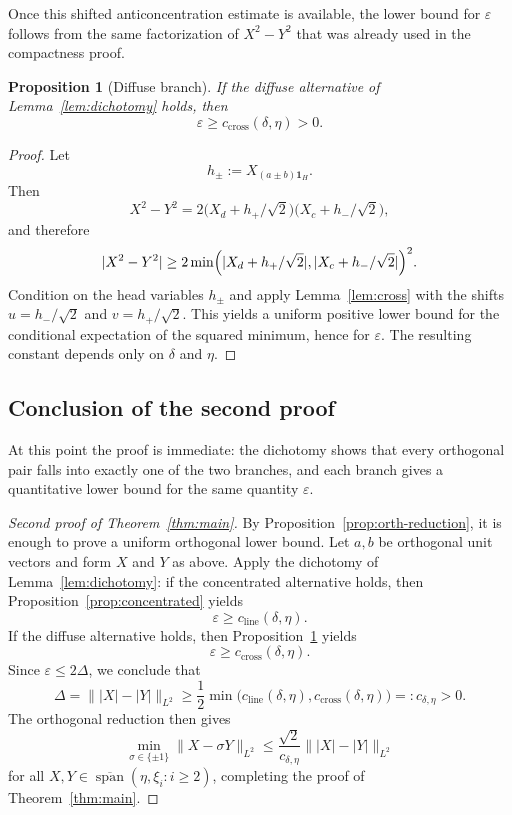 \documentclass[11pt]{amsart}
\numberwithin{equation}{section}
\newtheorem{proposition}[theorem]{Proposition}
\theoremstyle{definition}
\theoremstyle{remark}
\newcommand{\Span}{\operatorname{span}}
\newcommand{\eps}{\varepsilon}
\newcommand{\abs}[1]{\lvert #1 \rvert}
\newcommand{\norm}[1]{\lVert #1 \rVert}
\begin{document}
Once this shifted anticoncentration estimate is available, the lower bound for
$\eps$ follows from the same factorization of $X^2-Y^2$ that was
already used in the compactness proof.

\begin{proposition}[Diffuse branch]\label{prop:diffuse}
If the diffuse alternative of Lemma~\ref{lem:dichotomy} holds, then
\[
\eps\ge c_{\mathrm{cross}}(\delta,\eta)>0.
\]
\end{proposition}

\begin{proof}
Let
\[
h_\pm:=X_{(a\pm b)\mathbf 1_H}.
\]
Then
\[
X^2-Y^2
=2\bigl(X_d+h_+/\sqrt2\bigr)\bigl(X_c+h_-/\sqrt2\bigr),
\]
and therefore
\[
\abs{X^2-Y^2}
\ge
2\min\Bigl(\abs{X_d+h_+/\sqrt2},\abs{X_c+h_-/\sqrt2}\Bigr)^2.
\]
Condition on the head variables $h_\pm$ and apply Lemma~\ref{lem:cross} with
the shifts $u=h_-/\sqrt2$ and $v=h_+/\sqrt2$.  This yields a uniform positive
lower bound for the conditional expectation of the squared minimum, hence for
$\eps$.  The resulting constant depends only on $\delta$ and $\eta$.
\end{proof}

\subsection{Conclusion of the second proof}

At this point the proof is immediate: the dichotomy shows that every
orthogonal pair falls into exactly one of the two branches, and each branch
gives a quantitative lower bound for the same quantity $\eps$.

\begin{proof}[Second proof of Theorem~\ref{thm:main}]
By Proposition~\ref{prop:orth-reduction}, it is enough to prove a uniform
orthogonal lower bound.  Let $a,b$ be orthogonal unit vectors and form $X$
and $Y$ as above.  Apply the dichotomy of Lemma~\ref{lem:dichotomy}:
if the concentrated alternative holds, then
Proposition~\ref{prop:concentrated} yields
\[
\eps\ge c_{\mathrm{line}}(\delta,\eta).
\]
If the diffuse alternative holds, then Proposition~\ref{prop:diffuse} yields
\[
\eps\ge c_{\mathrm{cross}}(\delta,\eta).
\]
Since $\eps\le 2\Delta$, we conclude that
\[
\Delta
=\norm{|X|-|Y|}_{L^2}
\ge
\frac12\min\bigl(c_{\mathrm{line}}(\delta,\eta),c_{\mathrm{cross}}(\delta,\eta)\bigr)
=:c_{\delta,\eta}>0.
\]
The orthogonal reduction then gives
\[
\min_{\sigma\in\{\pm1\}}\norm{X-\sigma Y}_{L^2}
\le \frac{\sqrt2}{c_{\delta,\eta}}\norm{|X|-|Y|}_{L^2}
\]
for all $X,Y\in \overline{\Span}(\eta,\xi_i:i\ge2)$, completing the proof of
Theorem~\ref{thm:main}.
\end{proof}
\end{document}
